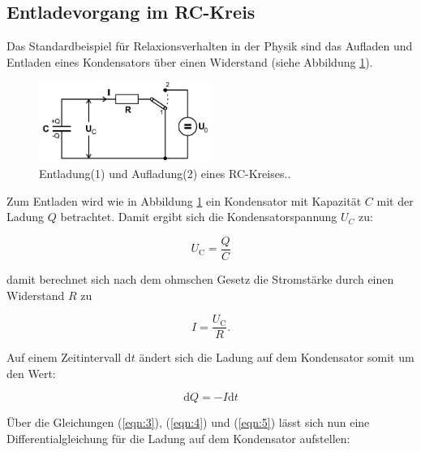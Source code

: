     \subsection{Entladevorgang im RC-Kreis}

        \noindent Das Standardbeispiel für Relaxionsverhalten in der Physik sind das Aufladen und Entladen eines Kondensators über einen 
        Widerstand (siehe Abbildung \ref{img:A_und_e}).

        \begin{figure}
            \centering
            \includegraphics[width=0.5\textwidth]{latex/images/Auflade_und_entlade.PNG}
            \caption{Entladung(1) und Aufladung(2) eines RC-Kreises.\protect \cite{V353}.}
            \label{img:A_und_e}
        \end{figure}

        \noindent Zum Entladen wird wie in Abbildung \ref{img:A_und_e} ein Kondensator mit Kapazität $C$ mit der Ladung $Q$ betrachtet.
        Damit ergibt sich die Kondensatorspannung $U_C$ zu:

        \begin{equation}
            U_{\text{C}} = \frac{Q}{C}
            \label{eqn:3}
        \end{equation}

        \noindent damit berechnet sich nach dem ohmschen Gesetz die Stromstärke durch einen Widerstand $R$ zu

        \begin{equation}
            I = \frac{U_{\text{C}}}{R} .
            \label{eqn:4}
        \end{equation}

        \noindent Auf einem Zeitintervall d$t$ ändert sich die Ladung auf dem Kondensator somit um den Wert:

        \begin{equation}
            \text{d}Q = -I \text{d}t
            \label{eqn:5}
        \end{equation}

        \noindent Über die Gleichungen (\ref{eqn:3}), (\ref{eqn:4}) und (\ref{eqn:5}) lässt sich nun eine Differentialgleichung für die 
        Ladung auf dem Kondensator aufstellen:

